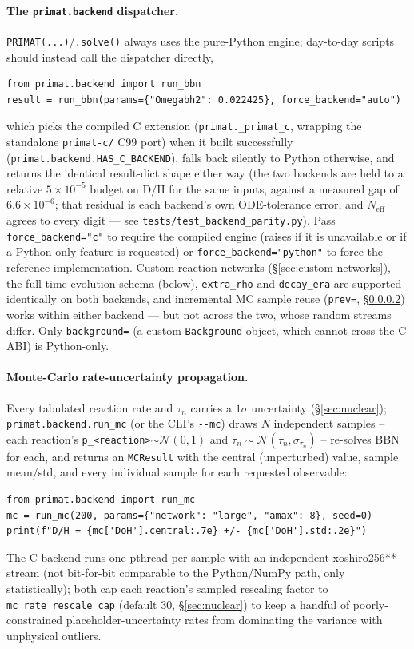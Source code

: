 \documentclass[11pt,a4paper]{article}
\newcommand{\Neff}{N_{\mathrm{eff}}}
\newcommand{\DoH}{\mathrm{D/H}}
\newcommand{\code}[1]{\texttt{#1}}
\begin{document}
\paragraph{The \code{primat.backend} dispatcher.}\label{sec:backends}
\code{PRIMAT(...)}/\code{.solve()} always uses the pure-Python engine;
day-to-day scripts should instead call the dispatcher directly,
\begin{lstlisting}[style=py]
from primat.backend import run_bbn
result = run_bbn(params={"Omegabh2": 0.022425}, force_backend="auto")
\end{lstlisting}
which picks the compiled C extension (\code{primat.\_primat\_c}, wrapping the
standalone \code{primat-c/} C99 port) when it built successfully
(\code{primat.backend.HAS\_C\_BACKEND}), falls back silently to Python
otherwise, and returns the identical result-dict shape either way (the two
backends are held to a relative $5\times10^{-5}$ budget on $\DoH$ for the same
inputs, against a measured gap of $6.6\times10^{-6}$; that residual is each
backend's own ODE-tolerance error, and $\Neff$ agrees to every digit --- see
\code{tests/test\_backend\_parity.py}). Pass
\code{force\_backend="c"} to require the compiled engine (raises if it is
unavailable or if a Python-only feature is requested) or
\code{force\_backend="python"} to force the reference implementation. Custom
reaction networks (\S\ref{sec:custom-networks}), the full time-evolution
schema (below), \code{extra\_rho} and \code{decay\_era} are supported
identically on both backends, and incremental MC sample reuse
(\code{prev=}, \S\ref{sec:mc-usage}) works within either backend --- but not
across the two, whose random streams differ. Only \code{background=} (a custom
\code{Background} object, which cannot cross the C ABI) is Python-only.

\paragraph{Monte-Carlo rate-uncertainty propagation.}\label{sec:mc-usage}
Every tabulated reaction rate and $\tau_n$ carries a $1\sigma$ uncertainty
(\S\ref{sec:nuclear}); \code{primat.backend.run\_mc} (or the CLI's
\code{-{}-mc}) draws $N$ independent samples -- each reaction's
\code{p\_<reaction>}$\sim\mathcal N(0,1)$ and $\tau_n\sim\mathcal
N(\tau_n,\sigma_{\tau_n})$ -- re-solves BBN for each, and returns an
\code{MCResult} with the central (unperturbed) value, sample mean/std, and
every individual sample for each requested observable:
\begin{lstlisting}[style=py]
from primat.backend import run_mc
mc = run_mc(200, params={"network": "large", "amax": 8}, seed=0)
print(f"D/H = {mc['DoH'].central:.7e} +/- {mc['DoH'].std:.2e}")
\end{lstlisting}
The C backend runs one pthread per sample with an independent
xoshiro256** stream (not bit-for-bit comparable to the Python/NumPy path,
only statistically); both cap each reaction's sampled rescaling factor to
\code{mc\_rate\_rescale\_cap} (default 30, \S\ref{sec:nuclear}) to keep a
handful of poorly-constrained placeholder-uncertainty rates from dominating
the variance with unphysical outliers.
\end{document}

